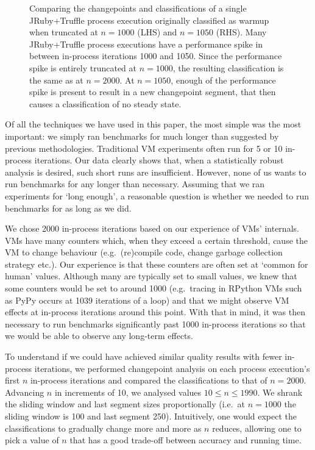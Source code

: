 \documentclass[acmsmall]{acmart}\settopmatter{printfolios=true}
\begin{document}
\begin{figure}[!tbp]
\begin{minipage}[t]{0.485\textwidth}
\end{minipage}
\caption{Comparing the changepoints and classifications of a
single JRuby+Truffle process execution originally classified as warmup when
truncated at $n = 1000$ (LHS) and $n = 1050$ (RHS). Many JRuby+Truffle process
executions have a performance spike in between in-process iterations 1000 and
1050. Since the performance spike is entirely truncated at $n=1000$,
the resulting classification is the same as at $n=2000$. At $n=1050$,
enough of the performance spike is present to result in a new changepoint segment,
that then causes a classification of no steady state.}
\label{fig:truncated}
\end{figure}

Of all the techniques we have used in this paper, the most simple was the most
important: we simply ran benchmarks for much longer than suggested by previous methodologies.
Traditional VM experiments often run for 5 or 10 in-process iterations. Our data
clearly shows that, when a statistically robust analysis is desired, such short
runs are insufficient. However, none of us wants to run benchmarks for any longer
than necessary. Assuming that we ran
experiments for `long enough', a reasonable question is whether we needed to run
benchmarks for as long as we did.

We chose 2000 in-process iterations based on our experience of VMs' internals.
VMs have many counters which, when they exceed a certain threshold, cause the VM
to change behaviour (e.g.~(re)compile code, change garbage collection strategy
etc.). Our experience is that these counters are often set at `common for human'
values. Although many are typically set to small values, we knew that some
counters would be set to around 1000 (e.g.~tracing in RPython VMs such
as PyPy occurs at 1039 iterations of a loop) and that we might observe VM effects at in-process iterations
around this point. With that in mind, it was then necessary to
run benchmarks significantly past 1000 in-process iterations so that we would
be able to observe any long-term effects.

To understand if we could have achieved similar quality results with fewer in-process
iterations, we performed changepoint analysis on each process execution's first
$n$ in-process iterations and compared the classifications to that of $n=2000$.
Advancing $n$ in increments of 10, we analysed values $10 \leq n \leq 1990$. We shrank the
sliding window and last segment sizes proportionally (i.e.~at $n=1000$ the
sliding window is 100 and last segment 250). Intuitively, one
would expect the classifications to gradually change more and more as $n$ reduces, allowing
one to pick a value of $n$ that has a good trade-off between accuracy and running time.
\end{document}
